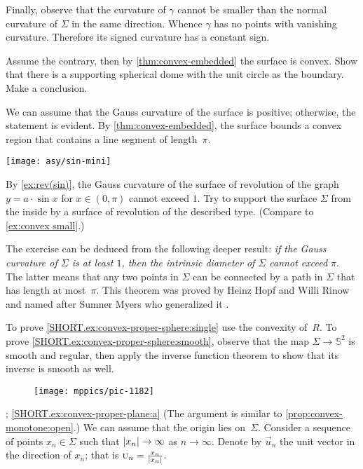 \begin{multicols}{2}
Finally, observe that the curvature of $\gamma$ cannot be smaller than the normal curvature of $\Sigma$ in the same direction.
Whence $\gamma$ has no points with vanishing curvature.
Therefore its signed curvature has a constant sign.


Assume the contrary, then by \ref{thm:convex-embedded} the surface is convex.
Show that there is a supporting spherical dome with the unit circle as the boundary.
Make a conclusion.

We can assume that the Gauss curvature of the surface is positive; otherwise, the statement is evident.
By \ref{thm:convex-embedded}, the surface bounds a convex region that contains a line segment of length~$\pi$.

\begin{Figure}
\vskip-0mm
\centering
\texttt{[image: asy/sin-mini]}
\vskip-0mm
\end{Figure}

By \ref{ex:rev(sin)}, the Gauss curvature of the surface of revolution of the graph $y=a\cdot \sin x$ for $x\in(0,\pi)$ cannot exceed $1$.
Try to support the surface $\Sigma$ from the inside by a surface of revolution of the described type.
(Compare to \ref{ex:convex small}.)

The exercise can be deduced from the following deeper result: \textit{if the Gauss curvature of $\Sigma$ is at least $1$,
then
the intrinsic diameter of $\Sigma$ cannot exceed $\pi$}.
The latter means that any two points in $\Sigma$ can be connected by a path in $\Sigma$ that has length at most~$\pi$.
This theorem was proved by Heinz Hopf and Willi Rinow \cite{hopf-rinow} and 
named after Sumner Myers who generalized it \cite{myers}.


To prove \ref{SHORT.ex:convex-proper-sphere:single} use the convexity of~$R$.
To prove \ref{SHORT.ex:convex-proper-sphere:smooth}, observe that the map $\Sigma\to\mathbb{S}^2$ is smooth and regular, then apply the inverse function theorem to show that its inverse is smooth as well.

\begin{wrapfigure}{r}{29 mm}
\vskip-4mm
\centering
\texttt{[image: mppics/pic-1182]}
\vskip-3mm
\end{wrapfigure}

\parbf{\ref{ex:convex-proper-plane}}; \ref{SHORT.ex:convex-proper-plane:a}
(The argument is similar to \ref{prop:convex-monotone:open}.)
We can assume that the origin lies on~$\Sigma$.
Consider a sequence of points $x_n\in \Sigma$ such that $|x_n|\z\to \infty$ as $n\to \infty$.
Denote by $\vec u_n$ the unit vector in the direction of $x_n$; that is $\vec u_n\z=\tfrac{x_n}{|x_n|}$.


\end{multicols}

